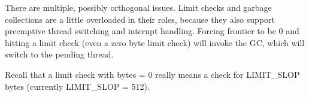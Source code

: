 
There are multiple, possibly orthogonal issues.  Limit checks and garbage
collections are a little overloaded in their roles, because they also
support preemptive thread switching and interupt handling.  Forcing
frontier to be 0 and hitting a limit check (even a zero byte limit check)
will invoke the GC, which will switch to the pending thread.

Recall that a limit check with bytes = 0 really means a check for LIMIT\_SLOP
bytes (currently LIMIT\_SLOP = 512).
